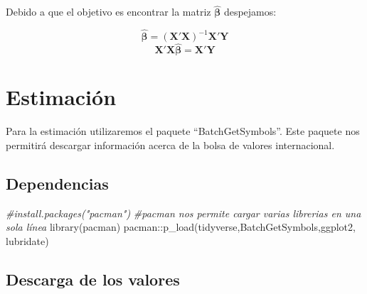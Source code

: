 \documentclass[
]{book}
\newenvironment{Shaded}{\begin{snugshade}}{\end{snugshade}}
\newcommand{\CommentTok}[1]{\textcolor[rgb]{0.56,0.35,0.01}{\textit{#1}}}
\newcommand{\FunctionTok}[1]{\textcolor[rgb]{0.00,0.00,0.00}{#1}}
\newcommand{\NormalTok}[1]{#1}
\newcommand{\SpecialCharTok}[1]{\textcolor[rgb]{0.00,0.00,0.00}{#1}}
\begin{document}
Debido a que el objetivo es encontrar la matriz \(\hat{\boldsymbol\beta}\) despejamos:

\[\hat{\boldsymbol \beta} = (\mathbf{X'X})^{-1}\mathbf{X'Y}
\]
\[
    \mathbf{X'X}\hat{\boldsymbol \beta} = \mathbf{X'Y}
\]

\hypertarget{estimaciuxf3n}{%
\section{Estimación}\label{estimaciuxf3n}}

Para la estimación utilizaremos el paquete ``BatchGetSymbols''. Este paquete nos permitirá descargar información acerca de la bolsa de valores internacional.

\hypertarget{dependencias}{%
\subsection{Dependencias}\label{dependencias}}

\begin{Shaded}
\begin{Highlighting}[]
\CommentTok{\#install.packages("pacman")}
\CommentTok{\#pacman nos permite cargar varias librerias en una sola línea}
\FunctionTok{library}\NormalTok{(pacman)}
\NormalTok{pacman}\SpecialCharTok{::}\FunctionTok{p\_load}\NormalTok{(tidyverse,BatchGetSymbols,ggplot2, lubridate)}
\end{Highlighting}
\end{Shaded}

\hypertarget{descarga-de-los-valores}{%
\subsection{Descarga de los valores}\label{descarga-de-los-valores}}
\end{document}
